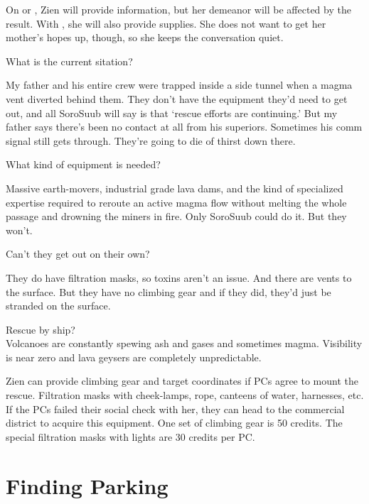 \documentclass{book}
\begin{document}
\begin{multicols}{2}
On \success or \failure, Zien will provide information, but her demeanor will be affected by the result. With \success, she will also provide supplies. She does not want to get her mother's hopes up, though, so she keeps the conversation quiet. 

What is the current sitation?\\
\begin{quoting}
My father and his entire crew were trapped inside a side tunnel when a magma vent diverted behind them. They don’t have the equipment they’d need to get out, and all SoroSuub will say is that ‘rescue efforts are continuing.’ But my father says there’s been no contact at all from his superiors. Sometimes his comm signal still gets through. They’re going to die of thirst down there.
\end{quoting}

What kind of equipment is needed? \\
\begin{quoting}
Massive earth-movers, industrial grade lava dams, and the kind of specialized expertise required to reroute an active magma flow without melting the whole passage and drowning the miners in fire. Only SoroSuub could do it. But they won’t.
\end{quoting}

Can't they get out on their own?  \\
\begin{quoting}
They do have filtration masks, so toxins aren’t an issue. And there are vents to the surface. But they have no climbing gear and if they did, they’d just be stranded on the surface.
\end{quoting}

Rescue by ship? \\
Volcanoes are constantly spewing ash and gases and sometimes magma. Visibility is near zero and lava geysers are completely unpredictable. 

Zien can provide climbing gear and target coordinates if PCs agree to mount the rescue. Filtration masks with cheek-lamps, rope, canteens of water, harnesses, etc. If the PCs failed their social check with her, they can head to the commercial district to acquire this equipment. One set of climbing gear is 50 credits. The special filtration masks with lights are 30 credits per PC.


\section{Finding Parking}


\end{multicols}
\end{document}
